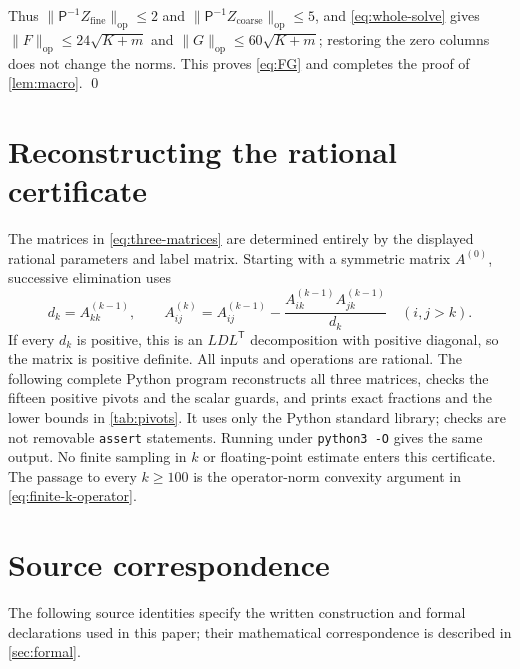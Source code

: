 \documentclass[11pt]{article}
\numberwithin{equation}{section}
\theoremstyle{definition}\newtheorem{definition}[theorem]{Definition}
\theoremstyle{remark}\newtheorem{remark}[theorem]{Remark}
\newcommand{\opnorm}[1]{\lVert #1\rVert_{\mathrm{op}}}
\newcommand{\T}{\mathsf T}\newcommand{\one}{\mathbf1}
\begin{document}
Thus $\opnorm{\mathsf P^{-1}Z_{\mathrm{fine}}}\le2$ and
$\opnorm{\mathsf P^{-1}Z_{\mathrm{coarse}}}\le5$, and
\eqref{eq:whole-solve} gives $\opnorm F\le24\sqrt{K+m}$ and
$\opnorm G\le60\sqrt{K+m}$; restoring the zero columns does not change
the norms. This proves \eqref{eq:FG} and completes the proof of
\cref{lem:macro}.
\qed




\section{Reconstructing the rational certificate}\label{app:certificate}
The matrices in \eqref{eq:three-matrices} are determined entirely by the
displayed rational parameters and label matrix. Starting with a symmetric
matrix $A^{(0)}$, successive elimination uses
\[
 d_k=A^{(k-1)}_{kk},\qquad
 A^{(k)}_{ij}=A^{(k-1)}_{ij}
 -\frac{A^{(k-1)}_{ik}A^{(k-1)}_{jk}}{d_k}\quad(i,j>k).
\]
If every $d_k$ is positive, this is an $LDL^\T$ decomposition with positive
diagonal, so the matrix is positive definite. All inputs and operations
are rational. The following complete Python program reconstructs all
three matrices, checks the fifteen positive pivots and the scalar guards,
and prints exact fractions and the lower bounds in \cref{tab:pivots}.
It uses only the Python standard library; checks are not removable
\texttt{assert} statements. Running under \texttt{python3 -O} gives the
same output. No finite sampling in $k$ or floating-point estimate enters
this certificate. The passage to every $k\ge100$ is the operator-norm
convexity argument in \eqref{eq:finite-k-operator}.



\section{Source correspondence}\label{app:sources}

The following source identities specify the written construction and
formal declarations used in this paper; their mathematical correspondence
is described in \cref{sec:formal}.
\end{document}
